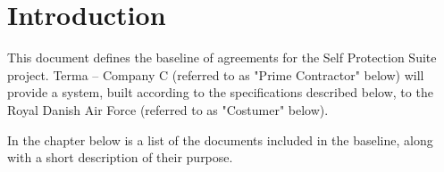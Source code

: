 \documentclass[Main]{subfiles}
\begin{document}
\chapter{Introduction}

This document defines the baseline of agreements for the Self Protection Suite project.
Terma -- Company C (referred to as "Prime Contractor" below) will provide a system, built according to the specifications described below, to the Royal Danish Air Force (referred to as "Costumer" below).

In the chapter below  is  a list of the documents included in the baseline, along with a short description of their purpose.
\end{document}

